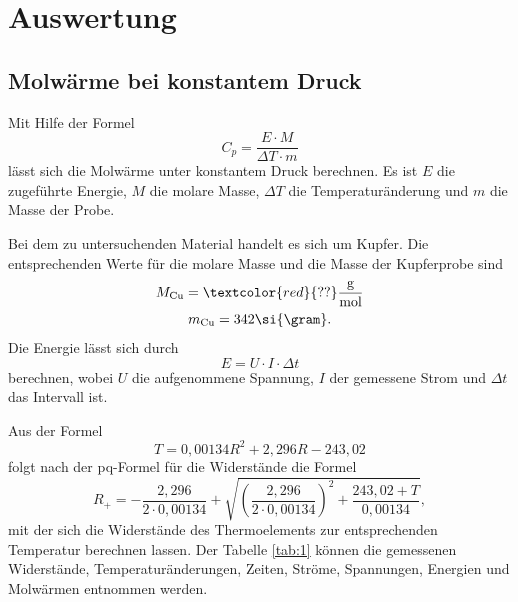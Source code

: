 \section{Auswertung}
\subsection{Molwärme bei konstantem Druck}
Mit Hilfe der Formel
\begin{equation}
  C_p = \frac{E \cdot M}{\Delta T \cdot m}
\end{equation}
lässt sich die Molwärme unter konstantem Druck berechnen.
Es ist $E$ die zugeführte Energie, $M$ die molare Masse, $\Delta T$ die Temperaturänderung und $m$ die Masse der Probe.

Bei dem zu untersuchenden Material handelt es sich um Kupfer.
Die entsprechenden Werte für die molare Masse und die Masse der Kupferprobe sind
\begin{gather*}
  M_{\text{Cu}} = \textcolor{red}{??}\frac{\text{g}}{\text{mol}} \\%
  m_{\text{Cu}} = 342\si{\gram}.
\end{gather*}
Die Energie lässt sich durch
\begin{equation}
  E = U\cdot I\cdot \Delta t
\end{equation}
berechnen, wobei $U$ die aufgenommene Spannung, $I$ der gemessene Strom und $\Delta t$ das Intervall ist.

Aus der Formel
\begin{equation}
  T = 0,00134R^2 + 2,296R - 243,02
\end{equation}
folgt nach der pq-Formel für die Widerstände die Formel
\begin{equation}
  R_+ = -\frac{2,296}{2\cdot0,00134} + \sqrt{ \left(\frac{2,296}{2\cdot0,00134}\right)^2 + \frac{243,02 + T}{0,00134} },
  \end{equation}
mit der sich die Widerstände des Thermoelements zur entsprechenden Temperatur berechnen lassen.
Der Tabelle \ref{tab:1} können die gemessenen Widerstände, Temperaturänderungen, Zeiten, Ströme, Spannungen, Energien und Molwärmen entnommen werden.



